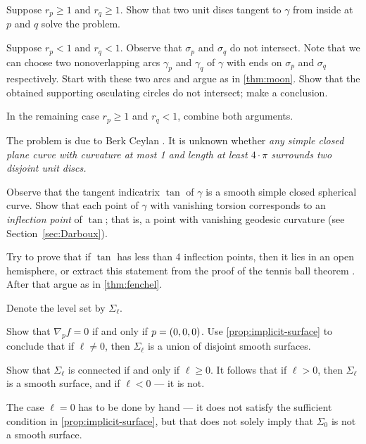 \begin{multicols}{2}
Suppose $r_p\ge 1$ and $r_q\ge1$.
Show that two unit discs tangent to $\gamma$ from inside at $p$ and $q$ solve the problem.

Suppose $r_p< 1$ and $r_q<1$.
Observe that $\sigma_p$ and $\sigma_q$ do not intersect.
Note that we can choose two nonoverlapping arcs $\gamma_p$ and $\gamma_q$ of $\gamma$ with ends on  $\sigma_p$ and $\sigma_q$ respectively.
Start with these two arcs and argue as in \ref{thm:moon}.
Show that the obtained supporting osculating circles do not intersect;
make a conclusion.

In the remaining case $r_p\ge 1$ and $r_q<1$, combine both arguments.

 The problem is due to Berk Ceylan \cite{ceylan}.
It is unknown whether \textit{any simple closed plane curve with curvature at most 1 and length at least $4\cdot\pi$ surrounds two disjoint unit discs.}

Observe that the tangent indicatrix $\tan$ of $\gamma$ is a smooth simple closed spherical curve.
Show that each point of $\gamma$ with vanishing torsion corresponds to an {}\emph{inflection point} of $\tan$;
that is, a point with vanishing geodesic curvature (see Section~\ref{sec:Darboux}).

Try to prove that if $\tan$ has less than 4 inflection points, then it lies in an open hemisphere,
or extract this statement from the proof of the tennis ball theorem \cite[§ 20]{arnold1994}.
After that argue as in \ref{thm:fenchel}.



\setcounter{eqtn}{0}

Denote the level set by $\Sigma_\ell$.

Show that $\nabla_p f=0$ if and only if $p\z=(0,0,0)$.
Use \ref{prop:implicit-surface} to conclude that if $\ell\ne 0$, then $\Sigma_\ell$ is a union of disjoint smooth surfaces.

Show that $\Sigma_\ell$ is connected if and only if $\ell\ge 0$.
It follows that if $\ell>0$, then $\Sigma_\ell$ is a smooth surface, and if $\ell<0$ --- it is not.

The case $\ell=0$ has to be done by hand --- it does not satisfy the sufficient condition in \ref{prop:implicit-surface}, but that does not solely imply that $\Sigma_0$ is not a smooth surface.


\end{multicols}
